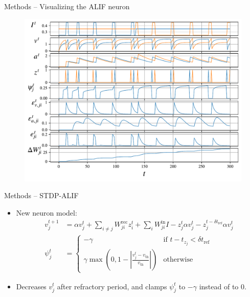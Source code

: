 \documentclass[t]{beamer}
\begin{document}
\begin{frame}{Methods -- Visualizing the ALIF neuron}
  \begin{figure}[!ht]
    \centering
    \includegraphics[width=0.8\linewidth]{alif}
  \end{figure}
\end{frame}

\begin{frame}{Methods -- STDP-ALIF}
  \begin{itemize}[label=--]
    \item New neuron model:
    \begin{align}\label{eq:ml_stdpalifV}
          v^{t+1}_{j} &= \alpha v_{j}^t + \sum_{i\neq j}W^\text{rec}_{ji}z_i^t + \sum_i W^\text{in}_{ji}I -z^t_{j}\alpha v^t_{j} - z_{j}^{t-\delta t_\text{ref}}\alpha v^t_{j}\\
          \psi^t_{j} &= \begin{cases}
          -\gamma&\mbox{if } t - t_{z_{j}} < \delta t_\text{ref}\\
          \gamma\max\left(0, 1 - \left|\frac{v^t_{j}-v_\text{th}}{v_\text{th}}\right|\right)&\mbox{otherwise}
          \end{cases}
    \end{align}
    \item Decreases $v^t_j$ after refractory period, and clamps $\psi^t_j$ to $-\gamma$ instead of to 0.
  \end{itemize}
\end{frame}
\end{document}
